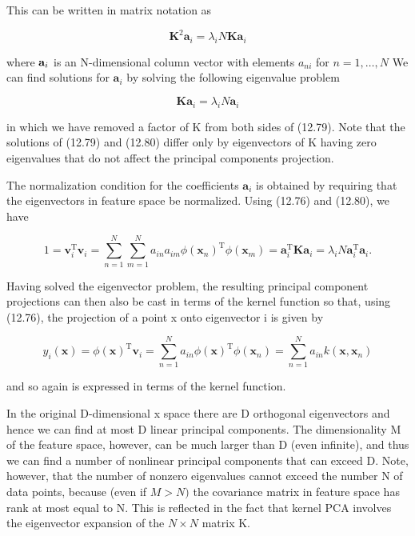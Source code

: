 \documentclass[
  10
]{article}
\begin{document}
This can be written in matrix notation as

\[
\mathbf {K} ^ {2} \mathbf {a} _ {i} = \lambda_ {i} N \mathbf {K} \mathbf {a} _ {i}\tag{12.79}
\]

where \({ \bf a } _ { i }\) is an N-dimensional column vector with
elements \(a _ { n i }\) for \(n = 1 , \ldots , N\) We can find
solutions for \(\mathbf { a } _ { i }\) by solving the following
eigenvalue problem

\[
\mathbf {K} \mathbf {a} _ {i} = \lambda_ {i} N \mathbf {a} _ {i}\tag{12.80}
\]

in which we have removed a factor of K from both sides of (12.79). Note
that the solutions of (12.79) and (12.80) differ only by eigenvectors of
K having zero eigenvalues that do not affect the principal components
projection.

The normalization condition for the coefficients
\(\mathbf { a } _ { i }\) is obtained by requiring that the eigenvectors
in feature space be normalized. Using (12.76) and (12.80), we have

\[
1 = \mathbf {v} _ {i} ^ {\mathrm{T}} \mathbf {v} _ {i} = \sum_ {n = 1} ^ {N} \sum_ {m = 1} ^ {N} a _ {i n} a _ {i m} \phi (\mathbf {x} _ {n}) ^ {\mathrm{T}} \phi (\mathbf {x} _ {m}) = \mathbf {a} _ {i} ^ {\mathrm{T}} \mathbf {K} \mathbf {a} _ {i} = \lambda_ {i} N \mathbf {a} _ {i} ^ {\mathrm{T}} \mathbf {a} _ {i}.\tag{12.81}
\]

Having solved the eigenvector problem, the resulting principal component
projections can then also be cast in terms of the kernel function so
that, using (12.76), the projection of a point x onto eigenvector i is
given by

\[
y _ {i} (\mathbf {x}) = \phi (\mathbf {x}) ^ {\mathrm{T}} \mathbf {v} _ {i} = \sum_ {n = 1} ^ {N} a _ {i n} \phi (\mathbf {x}) ^ {\mathrm{T}} \phi (\mathbf {x} _ {n}) = \sum_ {n = 1} ^ {N} a _ {i n} k (\mathbf {x}, \mathbf {x} _ {n})\tag{12.82}
\]

and so again is expressed in terms of the kernel function.

In the original D-dimensional x space there are D orthogonal
eigenvectors and hence we can find at most D linear principal
components. The dimensionality M of the feature space, however, can be
much larger than D (even infinite), and thus we can find a number of
nonlinear principal components that can exceed D. Note, however, that
the number of nonzero eigenvalues cannot exceed the number N of data
points, because (even if \(M > N )\) the covariance matrix in feature
space has rank at most equal to N. This is reflected in the fact that
kernel PCA involves the eigenvector expansion of the \(N \times N\)
matrix K.
\end{document}
